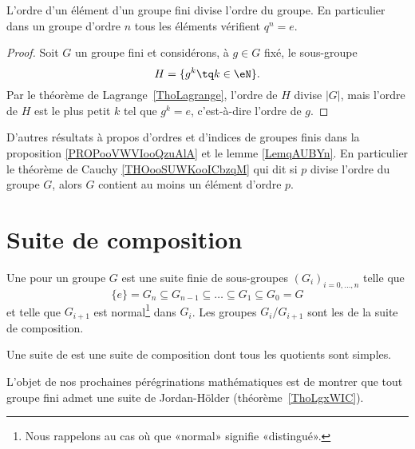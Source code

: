 \begin{corollary}       \label{CorpZItFX}
    L'ordre d'un élément d'un groupe fini divise l'ordre du groupe. En particulier dans un groupe d'ordre \( n\) tous les éléments vérifient \( q^n=e\).
\end{corollary}

\begin{proof}
    Soit \( G\) un groupe fini et considérons, à \( g \in G \) fixé, le sous-groupe
    \begin{equation}
        H=\{ g^k\tq k\in\eN \}.
    \end{equation}
    Par le théorème de Lagrange~\ref{ThoLagrange}, l'ordre de \( H\) divise \( | G |\), mais l'ordre de \( H\) est le plus petit \( k\) tel que \( g^k=e\), c'est-à-dire l'ordre de \( g\).
\end{proof}

D'autres résultats à propos d'ordres et d'indices de groupes finis dans la proposition \ref{PROPooVWVIooQzuAlA} et le lemme \ref{LemqAUBYn}. En particulier le théorème de Cauchy \ref{THOooSUWKooICbzqM} qui dit si \( p\) divise l'ordre du groupe \( G\), alors \( G\) contient au moins un élément d'ordre \( p\).

\section{Suite de composition}


\begin{definition}  \label{DefJWZSooNcntfK}
Une  pour un groupe \( G\) est une suite finie de sous-groupes \( (G_i)_{i=0,\ldots, n}\) telle que
\begin{equation}
    \{ e \}=G_n\subseteq G_{n-1}\subseteq\ldots\subseteq G_1\subseteq G_0=G
\end{equation}
et telle que \( G_{i+1}\) est normal\footnote{Nous rappelons au cas où que «normal» signifie «distingué».} dans \( G_i\). Les groupes \( G_i/G_{i+1}\) sont les  de la suite de composition.

    Une suite de  est une suite de composition dont tous les quotients sont simples.
\end{definition}
L'objet de nos prochaines pérégrinations mathématiques est de montrer que tout groupe fini admet une suite de Jordan-Hölder (théorème~\ref{ThoLgxWIC}).

